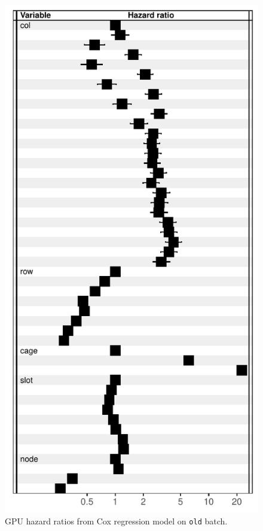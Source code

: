 \begin{figure}
  \includegraphics[width=\columnwidth]{figs/cox_o001.pdf}
  \caption{GPU hazard ratios from Cox regression model on {\tt old}
    batch.}
\end{figure}
